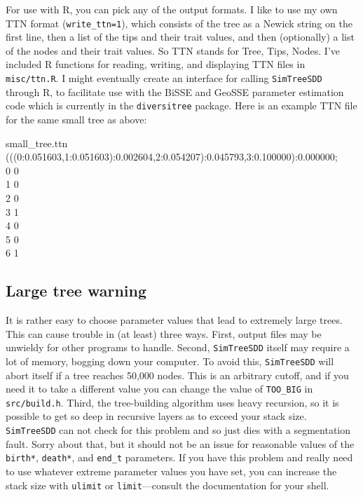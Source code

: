 \documentclass[10pt]{article}
\begin{document}
For use with R, you can pick any of the output formats.
I like to use my own TTN format (\texttt{write\_ttn=1}), which consists of the tree as a Newick string on the first line, then a list of the tips and their trait values, and then (optionally) a list of the nodes and their trait values.
So TTN stands for Tree, Tips, Nodes.
I've included R functions for reading, writing, and displaying TTN files in \texttt{misc/ttn.R}.
I might eventually create an interface for calling \texttt{SimTreeSDD} through R, to facilitate use with the BiSSE and GeoSSE parameter estimation code which is currently in the \texttt{diversitree} package.
Here is an example TTN file for the same small tree as above:
\begin{filesays}{small\_tree.ttn}
(((0:0.051603,1:0.051603):0.002604,2:0.054207):0.045793,3:0.100000):0.000000; \\
0    0	\\
1    0	\\
2    0	\\
3    1	\\
4    0	\\
5    0	\\
6    1
\end{filesays}


\subsection*{Large tree warning}

It is rather easy to choose parameter values that lead to extremely large trees.
This can cause trouble in (at least) three ways.
First, output files may be unwieldy for other programs to handle.
Second, \texttt{SimTreeSDD} itself may require a lot of memory, bogging down your computer.
To avoid this, \texttt{SimTreeSDD} will abort itself if a tree reaches 50,000 nodes.
This is an arbitrary cutoff, and if you need it to take a different value you can change the value of \texttt{TOO\_BIG} in \texttt{src/build.h}.
Third, the tree-building algorithm uses heavy recursion, so it is possible to get so deep in recursive layers as to exceed your stack size.
\texttt{SimTreeSDD} can not check for this problem and so just dies with a segmentation fault.  Sorry about that, but it should not be an issue for reasonable values of the \texttt{birth*}, \texttt{death*}, and \texttt{end\_t} parameters.
If you have this problem and really need to use whatever extreme parameter values you have set, you can increase the stack size with \texttt{ulimit} or \texttt{limit}---consult the documentation for your shell.
\end{document}
